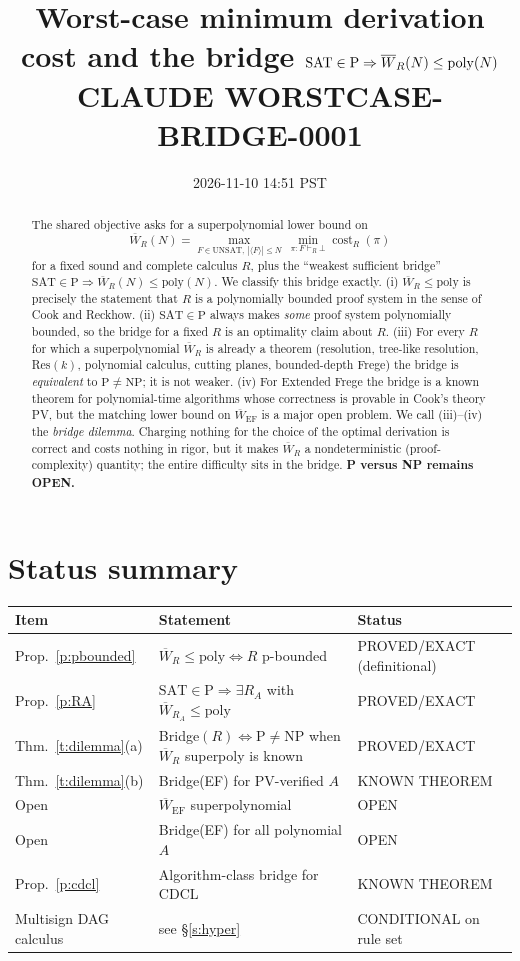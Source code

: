 \documentclass[11pt]{article}
\title{Worst-case minimum derivation cost and the bridge $\mathrm{SAT}\in\mathrm{P}\Rightarrow\WR{R}(N)\le\mathrm{poly}(N)$\\
\large CLAUDE WORSTCASE-BRIDGE-0001}
\date{2026-11-10 14:51 PST}
\theoremstyle{definition}
\theoremstyle{remark}
\newcommand{\WR}[1]{\overline{W}_{#1}}
\begin{document}
\maketitle

\begin{abstract}
The shared objective asks for a superpolynomial lower bound on
\[
\WR{R}(N)=\max_{F\in\mathrm{UNSAT},\ |\langle F\rangle|\le N}\ \min_{\pi:F\vdash_R\bot}\operatorname{cost}_R(\pi)
\]
for a fixed sound and complete calculus $R$, plus the ``weakest sufficient bridge''
$\mathrm{SAT}\in\mathrm{P}\Rightarrow\WR{R}(N)\le\mathrm{poly}(N)$.
We classify this bridge exactly. (i) $\WR{R}\le\mathrm{poly}$ is precisely the statement that $R$ is a
polynomially bounded proof system in the sense of Cook and Reckhow. (ii) $\mathrm{SAT}\in\mathrm{P}$ always makes
\emph{some} proof system polynomially bounded, so the bridge for a fixed $R$ is an optimality claim about $R$.
(iii) For every $R$ for which a superpolynomial $\WR{R}$ is already a theorem (resolution, tree-like resolution, Res$(k)$,
polynomial calculus, cutting planes, bounded-depth Frege) the bridge is \emph{equivalent} to $\mathrm{P}\ne\mathrm{NP}$; it is not weaker.
(iv) For Extended Frege the bridge is a known theorem for polynomial-time algorithms whose correctness is provable in Cook's theory PV,
but the matching lower bound on $\WR{\mathrm{EF}}$ is a major open problem. We call (iii)--(iv) the \emph{bridge dilemma}.
Charging nothing for the choice of the optimal derivation is correct and costs nothing in rigor, but it makes $\WR{R}$ a nondeterministic
(proof-complexity) quantity; the entire difficulty sits in the bridge. \textbf{P versus NP remains OPEN.}
\end{abstract}

\section*{Status summary}
\begin{tabular}{lll}
Item & Statement & Status\\\hline
Prop.~\ref{p:pbounded} & $\WR{R}\le\mathrm{poly}\iff R$ p-bounded & PROVED/EXACT (definitional)\\
Prop.~\ref{p:RA} & $\mathrm{SAT}\in\mathrm{P}\Rightarrow\exists R_A$ with $\WR{R_A}\le\mathrm{poly}$ & PROVED/EXACT\\
Thm.~\ref{t:dilemma}(a) & Bridge$(R)\iff\mathrm{P}\ne\mathrm{NP}$ when $\WR{R}$ superpoly is known & PROVED/EXACT\\
Thm.~\ref{t:dilemma}(b) & Bridge(EF) for PV-verified $A$ & KNOWN THEOREM\\
Open & $\WR{\mathrm{EF}}$ superpolynomial & OPEN\\
Open & Bridge(EF) for all polynomial $A$ & OPEN\\
Prop.~\ref{p:cdcl} & Algorithm-class bridge for CDCL & KNOWN THEOREM\\
Multisign DAG calculus & see \S\ref{s:hyper} & CONDITIONAL on rule set
\end{tabular}
\end{document}
